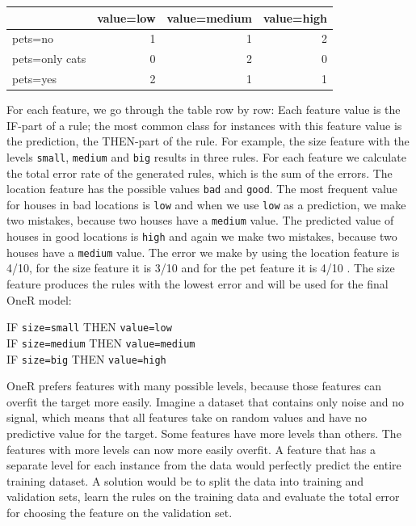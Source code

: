 \documentclass[
  10pt,
]{scrbook}
\begin{document}
\begin{table}
\centering
\begin{tabular}{lrrr}
\toprule
  & value=low & value=medium & value=high\\
\midrule
pets=no & 1 & 1 & 2\\
pets=only cats & 0 & 2 & 0\\
pets=yes & 2 & 1 & 1\\
\bottomrule
\end{tabular}
\end{table}

For each feature, we go through the table row by row:
Each feature value is the IF-part of a rule;
the most common class for instances with this feature value is the prediction, the THEN-part of the rule.
For example, the size feature with the levels \texttt{small}, \texttt{medium} and \texttt{big} results in three rules.
For each feature we calculate the total error rate of the generated rules, which is the sum of the errors.
The location feature has the possible values \texttt{bad} and \texttt{good}.
The most frequent value for houses in bad locations is \texttt{low} and when we use \texttt{low} as a prediction, we make two mistakes, because two houses have a \texttt{medium} value.
The predicted value of houses in good locations is \texttt{high} and again we make two mistakes, because two houses have a \texttt{medium} value.
The error we make by using the location feature is 4/10, for the size feature it is 3/10 and for the pet feature it is 4/10 .
The size feature produces the rules with the lowest error and will be used for the final OneR model:

IF \texttt{size=small} THEN \texttt{value=low}\\
IF \texttt{size=medium} THEN \texttt{value=medium}\\
IF \texttt{size=big} THEN \texttt{value=high}

OneR prefers features with many possible levels, because those features can overfit the target more easily.
Imagine a dataset that contains only noise and no signal, which means that all features take on random values and have no predictive value for the target.
Some features have more levels than others.
The features with more levels can now more easily overfit.
A feature that has a separate level for each instance from the data would perfectly predict the entire training dataset.
A solution would be to split the data into training and validation sets, learn the rules on the training data and evaluate the total error for choosing the feature on the validation set.
\end{document}
